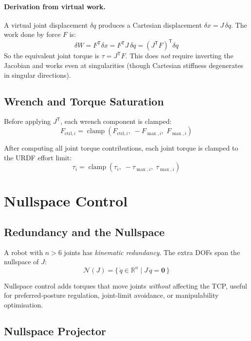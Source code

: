 \documentclass[11pt,a4paper]{article}
\newcommand{\R}{\mathbb{R}}
\newcommand{\tr}{\mathsf{T}}
\newcommand{\clamp}{\operatorname{clamp}}
\begin{document}
\paragraph{Derivation from virtual work.}
A virtual joint displacement $\delta q$ produces a Cartesian displacement
$\delta x = J\,\delta q$.  The work done by force $F$ is:
\[
  \delta W
  = F^\tr \delta x
  = F^\tr J\,\delta q
  = (J^\tr F)^\tr \delta q
\]
So the equivalent joint torque is $\tau = J^\tr F$.  This does \emph{not}
require inverting the Jacobian and works even at singularities (though
Cartesian stiffness degenerates in singular directions).

\subsection{Wrench and Torque Saturation}

Before applying $J^\tr$, each wrench component is clamped:
\[
  F_{\text{ctrl},i}
  = \clamp(F_{\text{ctrl},i},\; -F_{\max,i},\; F_{\max,i})
\]

After computing all joint torque contributions, each joint torque is clamped to
the URDF effort limit:
\[
  \tau_i = \clamp(\tau_i,\; -\tau_{\max,i},\; \tau_{\max,i})
\]


\section{Nullspace Control}
\label{sec:nullspace}

\subsection{Redundancy and the Nullspace}

A robot with $n > 6$ joints has \emph{kinematic redundancy}.  The extra DOFs
span the nullspace of $J$:
\[
  \mathcal{N}(J)
  = \bigl\{\, \dot{q} \in \R^n \mid J\,\dot{q} = \bm{0} \,\bigr\}
\]

Nullspace control adds torques that move joints \emph{without} affecting the TCP,
useful for preferred-posture regulation, joint-limit avoidance, or manipulability
optimisation.

\subsection{Nullspace Projector}
\end{document}
